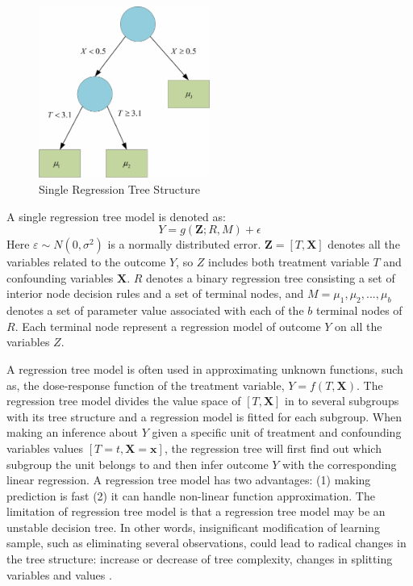 \begin{figure}[!thpb]
\centering
\includegraphics[width=0.5\textwidth]{chapter4_SingleRGT.pdf}
\caption{Single Regression Tree Structure}
\label{singlergt}
\end{figure}

A single regression tree model is denoted as:
\begin{equation*}
Y=g(\pmb{Z}; R, M)+\epsilon
\end{equation*}
Here $\varepsilon  \sim N(0,{\sigma ^2})$ is a normally distributed error. $\pmb{Z}=[T,\pmb{X}]$ denotes all the variables related to the outcome $Y$, so $Z$ includes both treatment variable $T$ and confounding variables $\pmb{X}$. $R$ denotes a binary regression tree consisting a set of interior node decision rules and a set of terminal nodes, and $M=
{
 \mu _1, \mu _2, . . ., \mu _b
}$
denotes a set of parameter value associated with each of the $b$ terminal nodes of $R$. Each terminal node represent a regression model of outcome $Y$ on all the variables $Z$.

A regression tree model is often used in approximating unknown functions, such as, the dose-response function of the treatment variable, $Y=f(T,\pmb{X})$. The regression tree model divides the value space of $[T,\pmb{X}]$ in to several subgroups with its tree structure and a regression model is fitted for each subgroup. When making an inference about $Y$ given a specific unit of treatment and confounding variables values $[T=t,\pmb{X}=\pmb{x}]$, the regression tree will first find out which subgroup the unit belongs to and then infer outcome $Y$ with the corresponding linear regression. A regression tree model has two advantages: (1) making prediction is fast (2) it can handle non-linear function approximation.  The limitation of regression tree model is that a regression tree model may be an unstable decision tree. In other words, insignificant modification of learning sample, such as eliminating several observations, could lead to radical changes in the tree structure: increase or decrease of tree complexity, changes in splitting variables and values \cite{timofeev2004classification}.


